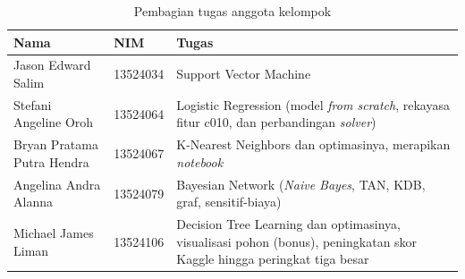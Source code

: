 \begin{table}[H]
	\centering
	\caption{Pembagian tugas anggota kelompok}
	\label{tab:pembagian}
	\begin{tabular}{l l p{6cm}}
		\toprule
		\textbf{Nama} & \textbf{NIM} & \textbf{Tugas} \\
		\midrule
		Jason Edward Salim & 13524034 & Support Vector Machine \\
		Stefani Angeline Oroh & 13524064 & Logistic Regression (model \textit{from scratch}, rekayasa fitur c010, dan perbandingan \textit{solver}) \\
		Bryan Pratama Putra Hendra & 13524067 & K-Nearest Neighbors dan optimasinya, merapikan \textit{notebook} \\
		Angelina Andra Alanna & 13524079 & Bayesian Network (\textit{Naive Bayes}, TAN, KDB, graf, sensitif-biaya) \\
		Michael James Liman & 13524106 & Decision Tree Learning dan optimasinya, visualisasi pohon (bonus), peningkatan skor Kaggle hingga peringkat tiga besar \\
		\bottomrule
	\end{tabular}
\end{table}

